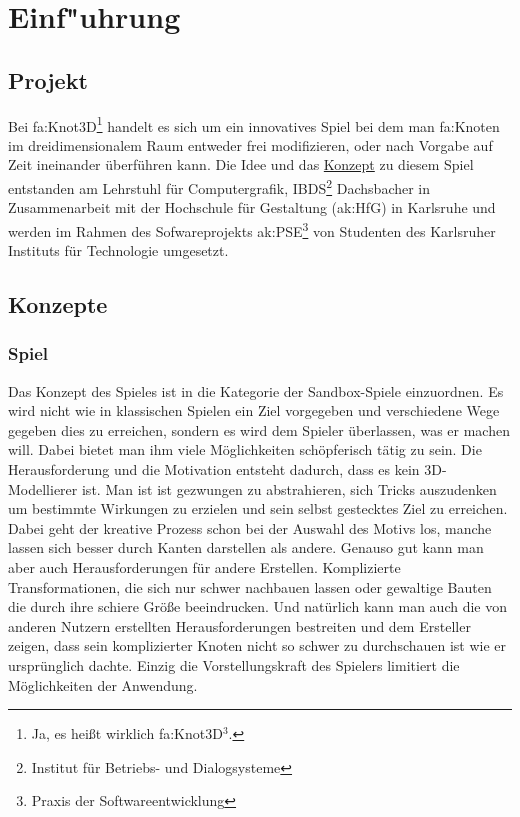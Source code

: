 %
%


\chapter{Einf{"u}hrung}
\label{EF}


\section{Projekt}

Bei \gls{fa:Knot3D}\footnote[3]{Ja, es heißt wirklich \gls{fa:Knot3D}$^3$.} handelt es sich um ein innovatives Spiel bei dem man \gls{fa:Knoten} im dreidimensionalem Raum entweder frei modifizieren, oder nach Vorgabe auf Zeit ineinander überführen kann.
Die Idee und das \hyperlink{EF:Spielkonzept}{Konzept} zu diesem Spiel entstanden am Lehrstuhl für Computergrafik, IBDS\footnote{Institut für Betriebs- und Dialogsysteme} Dachsbacher in Zusammenarbeit mit der Hochschule für Gestaltung (\gls{ak:HfG}) in Karlsruhe und werden im Rahmen des Sofwareprojekts \gls{ak:PSE}\footnote{Praxis der Softwareentwicklung} von Studenten des Karlsruher Instituts für Technologie umgesetzt.


\section{Konzepte}
\label{EF:Konzepte}

\subsection{Spiel}
\label{EF:Spielkonzept}

Das Konzept des Spieles ist in die Kategorie der Sandbox-Spiele einzuordnen. Es wird nicht wie in klassischen Spielen ein Ziel vorgegeben und verschiedene Wege gegeben dies zu erreichen, sondern es wird dem Spieler überlassen, was er machen will. Dabei bietet man ihm viele Möglichkeiten schöpferisch tätig zu sein. Die Herausforderung und die Motivation entsteht dadurch, dass es kein 3D-Modellierer ist. Man ist ist gezwungen zu abstrahieren, sich Tricks auszudenken um bestimmte Wirkungen zu erzielen und sein selbst gestecktes Ziel zu erreichen. Dabei geht der kreative Prozess schon bei der Auswahl des Motivs los, manche lassen sich besser durch Kanten darstellen als andere.
Genauso gut kann man aber auch Herausforderungen für andere Erstellen. Komplizierte Transformationen, die sich nur schwer nachbauen lassen oder gewaltige Bauten die durch ihre schiere Größe beeindrucken. Und natürlich kann man auch die von anderen Nutzern erstellten Herausforderungen bestreiten und dem Ersteller zeigen, dass sein komplizierter Knoten nicht so schwer zu durchschauen ist wie er ursprünglich dachte.
Einzig die Vorstellungskraft des Spielers limitiert die Möglichkeiten der Anwendung.


